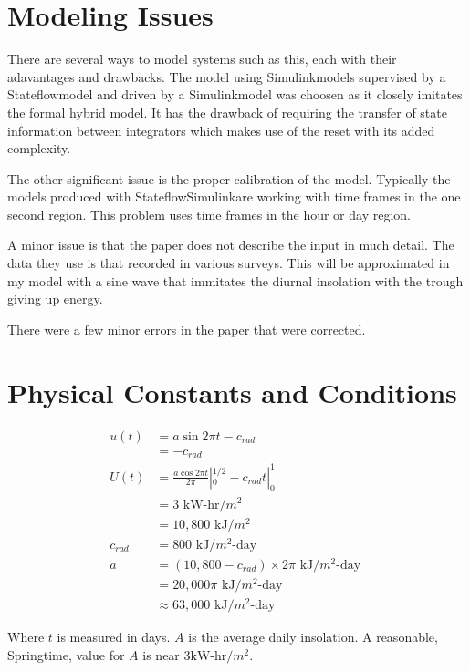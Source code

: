 \documentclass{article}
\begin{document}
\section{Modeling Issues}

There are several ways to model systems such as this,
each with their adavantages and drawbacks.
The model using Simulink\textregistered models supervised
by a Stateflow\textregistered model and driven by a
Simulink\textregistered model was choosen as it
closely imitates the formal hybrid model.
It has the drawback of requiring the transfer of
state information between integrators which makes use
of the reset with its added complexity.

The other significant issue is the proper calibration of the model.
Typically the models produced with
Stateflow\textregistered Simulink\textregistered are working
with time frames in the one second region.
This problem uses time frames in the hour or day region.

A minor issue is that the paper does not describe
the input in much detail.
The data they use is that recorded in various surveys.
This will be approximated in my model with a sine wave
that immitates the diurnal insolation with the trough
giving up energy.

There were a few minor errors in the paper that were corrected.


\section{Physical Constants and Conditions}

\begin{align}
u(t) &= a \sin{2 \pi t} - c_{rad} \\
 &= - c_{rad} \\
U(t) &= \frac{a \cos{2 \pi t}}{2 \pi} |_0^{1/2} - c_{rad} t |_0^1 \\
  &= 3 \text{ kW-hr/$m^2$ } \\
  &= 10,800 \text{ kJ/$m^2$ } \\
c_{rad} &= 800 \text{ kJ/$m^2$-day } \\
a &= (10,800 - c_{rad}) \times 2 \pi \text{ kJ/$m^2$-day } \\
 &= 20,000 \pi \text{ kJ/$m^2$-day } \\
 &\approx 63,000 \text{ kJ/$m^2$-day }
\end{align}

Where $t$ is measured in days.
$A$ is the average daily insolation.
A reasonable, Springtime, value for $A$ is near $3 \text{kW-hr}/m^2$.
\end{document}
